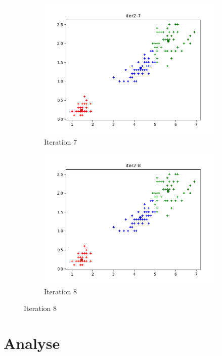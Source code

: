 \documentclass[french]{article}
\begin{document}
\begin{figure}[h!]
\centering
\begin{subfigure}{.5\textwidth}
  \centering
  \includegraphics[width=\linewidth]{img/iter2-7.png}
  \caption{Iteration 7}
\end{subfigure}%
\begin{subfigure}{.5\textwidth}
  \centering
  \includegraphics[width=\linewidth]{img/iter2-8.png}
  \caption{Iteration 8}
\end{subfigure}%
\end{figure}

\newpage
\section{Analyse}
\end{document}
